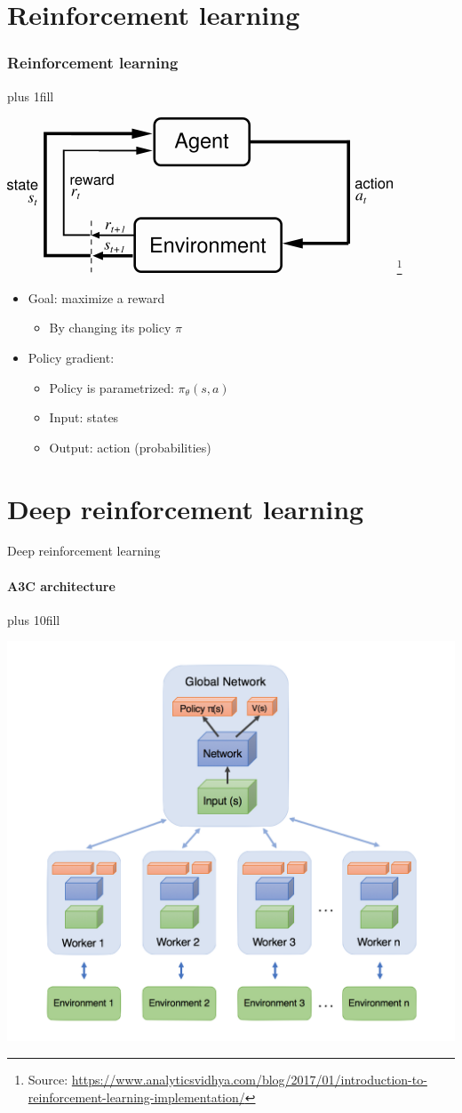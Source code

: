 \documentclass{beamer}
\begin{document}
\section{Reinforcement learning}
\begin{frame}[fragile]\frametitle{Reinforcement learning}
\vskip0pt plus 1fill
\begin{center}
    \includegraphics[width=.7\linewidth]{reinforcementlearning.png}
    \footnote{Source: \url{https://www.analyticsvidhya.com/blog/2017/01/introduction-to-reinforcement-learning-implementation/}}
\end{center}
\begin{itemize}
    \item Goal: maximize a reward
    \begin{itemize}
        \item By changing its policy $\pi$
    \end{itemize}
    \item Policy gradient:
    \begin{itemize}
        \item Policy is parametrized: $\pi_\theta(s,a)$
        \item Input: states
        \item Output: action (probabilities)
    \end{itemize}
\end{itemize}
\end{frame}

\section{Deep reinforcement learning}
\begin{frame}[fragile]{Deep reinforcement learning}
\framesubtitle{A3C architecture}
\vskip0pt plus 10fill
\begin{center}
    \includegraphics[width=.7\linewidth]{A3Carchitecture}
\end{center}
\end{frame}
\end{document}
